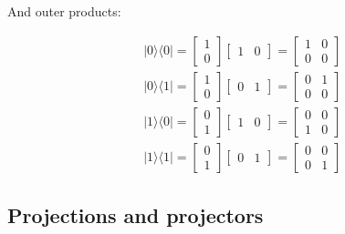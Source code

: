 \documentclass[main.tex]{subfiles}
\begin{document}
    And outer products:
    
    $$
    \begin{aligned}
    &|0\rangle\langle 0|=\left[\begin{array}{l}
    1 \\
    0
    \end{array}\right]\left[\begin{array}{ll}
    1 & 0
    \end{array}\right]=\left[\begin{array}{ll}
    1 & 0 \\
    0 & 0
    \end{array}\right] \\
    &|0\rangle\langle 1|=\left[\begin{array}{l}
    1 \\
    0
    \end{array}\right]\left[\begin{array}{ll}
    0 & 1
    \end{array}\right]=\left[\begin{array}{ll}
    0 & 1 \\
    0 & 0
    \end{array}\right] \\
    &|1\rangle\langle 0|=\left[\begin{array}{l}
    0 \\
    1
    \end{array}\right]\left[\begin{array}{ll}
    1 & 0
    \end{array}\right]=\left[\begin{array}{ll}
    0 & 0 \\
    1 & 0
    \end{array}\right] \\
    &|1\rangle\langle 1|=\left[\begin{array}{l}
    0 \\
    1
    \end{array}\right]\left[\begin{array}{ll}
    0 & 1
    \end{array}\right]=\left[\begin{array}{ll}
    0 & 0 \\
    0 & 1
    \end{array}\right]
    \end{aligned}
    $$

\subsection{Projections and projectors}
\end{document}
